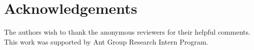 
\section*{Acknowledgements}
The authors wish to thank the anonymous reviewers for their helpful comments. This work was supported by Ant Group Research Intern Program.